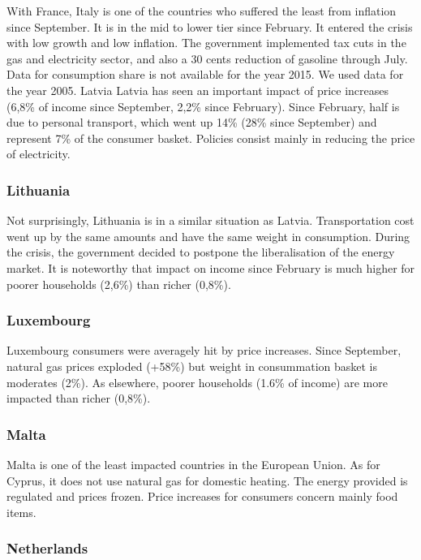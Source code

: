 \documentclass[
  9pt,
  a4paper,
  DIV=11,
  numbers=noendperiod]{scrartcl}
\begin{document}
With France, Italy is one of the countries who suffered the least from
inflation since September. It is in the mid to lower tier since
February. It entered the crisis with low growth and low inflation. The
government implemented tax cuts in the gas and electricity sector, and
also a 30 cents reduction of gasoline through July. Data for consumption
share is not available for the year 2015. We used data for the year
2005. Latvia Latvia has seen an important impact of price increases
(6,8\% of income since September, 2,2\% since February). Since February,
half is due to personal transport, which went up 14\% (28\% since
September) and represent 7\% of the consumer basket. Policies consist
mainly in reducing the price of electricity.

\hypertarget{lithuania}{%
\subsubsection{Lithuania}\label{lithuania}}

Not surprisingly, Lithuania is in a similar situation as Latvia.
Transportation cost went up by the same amounts and have the same weight
in consumption. During the crisis, the government decided to postpone
the liberalisation of the energy market. It is noteworthy that impact on
income since February is much higher for poorer households (2,6\%) than
richer (0,8\%).

\hypertarget{luxembourg}{%
\subsubsection{Luxembourg}\label{luxembourg}}

Luxembourg consumers were averagely hit by price increases. Since
September, natural gas prices exploded (+58\%) but weight in
consummation basket is moderates (2\%). As elsewhere, poorer households
(1.6\% of income) are more impacted than richer (0,8\%).

\hypertarget{malta}{%
\subsubsection{Malta}\label{malta}}

Malta is one of the least impacted countries in the European Union. As
for Cyprus, it does not use natural gas for domestic heating. The energy
provided is regulated and prices frozen. Price increases for consumers
concern mainly food items.

\hypertarget{netherlands}{%
\subsubsection{Netherlands}\label{netherlands}}
\end{document}
